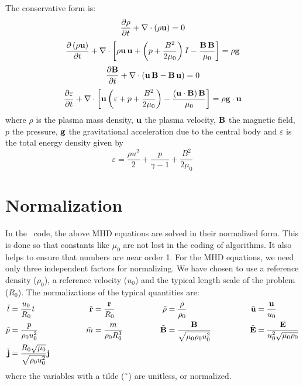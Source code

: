 The conservative form is:
\begin{equation}
\label{eq:continuity_conserve}
\frac{\partial \rho}{\partial t} + \nabla\cdot \left(\rho {\bf u}\right)
= 0
\end{equation}
\begin{equation}
\label{eq:momentum_conserve}
\frac{\partial \left(\rho {\bf u}\right)}{\partial t} +
\nabla\cdot\left[
\rho{\bf u\,u}+
\left(p + \frac{B^2}{2 \mu_0}\right)I
- \frac{{\bf B\,B}}{\mu_0}\right] =
\rho {\bf g}
\end{equation}
\begin{equation}
\label{eq:bfield_conserve}
\frac{\partial {\bf B}}{\partial t} + \nabla\cdot\left({\bf u\,B} - {\bf
B\,u}\right) = 0
\end{equation}
\begin{equation}
\label{eq:energy_conserve}
\frac{\partial\varepsilon}{\partial t}
+  \nabla \cdot \left[ {\bf u} \left( \varepsilon + p
+ \frac{B^2}{2 \mu_0} \right) - \frac{\left({\bf u}\cdot{\bf B}\right) {\bf
B}}{\mu_0}\right] =
\rho {\bf g}\cdot {\bf u}
\end{equation}
where $\rho$ is the plasma mass density, $\bf u$ the plasma velocity, 
$\bf B$ the magnetic field, $p$ the pressure, ${\bf g}$ the
gravitational acceleration due to the central body and  $\varepsilon$
is the total energy density given by 
\begin{equation}
\varepsilon=\frac{\rho u^2}{2}+\frac{p}{\gamma-1}+\frac{B^2}{2\mu_0}
\end{equation}


\section{Normalization \label{section:normalization}}

In the \BATSRUS\ code, the above MHD equations are solved in their
normalized form.  This is done so that constants like $\mu_0$
are not lost in the coding of algorithms.  It also helps
to ensure that numbers are near order 1.  For the
MHD equations, we need only three independent factors for normalizing.
We have chosen to use a reference density ($\rho_0$), 
a reference velocity ($u_0$) and the
typical length scale of the problem ($R_0$).  The normalizations of
the typical quantities are: 
\begin{alignat}{4}
\tilde{t}     &= \frac{u_0}{R_0} t                         & \qquad \qquad
\tilde{\bf r} &= \frac{\bf r}{R_0}                         & \qquad \qquad
\tilde{\rho}  &= \frac{\rho}{\rho_0}                       & \qquad \qquad
\tilde{\bf u} &= \frac{\bf u}{u_0}                           \nonumber \\
\tilde{p}     &= \frac{p}{\rho_0 u_0^2}                    & 
\tilde{m}     &= \frac{m}{\rho_0 R_0^3}                    &
\tilde{\bf B} &= \frac{\bf B}{\sqrt{\mu_0 \rho_0 u_0^2}}   &  
\tilde{\bf E} &= \frac{\bf E}{u_0^2 \sqrt{\mu_0 \rho_0}}   \nonumber \\
\tilde{\bf j} &= \frac{R_0 \sqrt{\mu_0}}{\sqrt{ \rho_0 u_0^2}}{\bf j} 
\end{alignat}
where the variables with a tilde (\~\ ) are unitless, or normalized.

